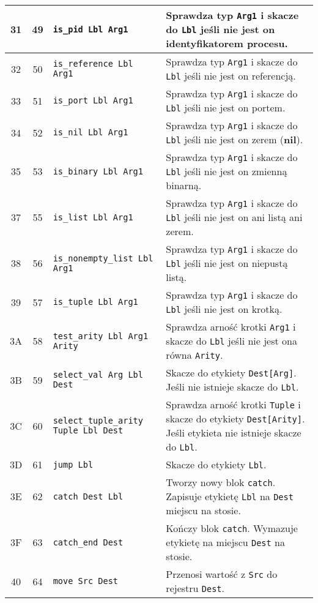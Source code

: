 \begin{longtable}{|c|c|p{5cm}|p{7cm}|}
\hline
31 & 49 & \texttt{is\_pid Lbl Arg1} & Sprawdza typ \texttt{Arg1} i skacze do \texttt{Lbl} jeśli nie jest on identyfikatorem procesu.\\
\hline
32 & 50 & \texttt{is\_reference Lbl Arg1} & Sprawdza typ \texttt{Arg1} i skacze do \texttt{Lbl} jeśli nie jest on referencją.\\
\hline
33 & 51 & \texttt{is\_port Lbl Arg1} & Sprawdza typ \texttt{Arg1} i skacze do \texttt{Lbl} jeśli nie jest on portem.\\
\hline
34 & 52 & \texttt{is\_nil Lbl Arg1} & Sprawdza typ \texttt{Arg1} i skacze do \texttt{Lbl} jeśli nie jest on zerem (\textbf{nil}).\\
\hline
35 & 53 & \texttt{is\_binary Lbl Arg1} & Sprawdza typ \texttt{Arg1} i skacze do \texttt{Lbl} jeśli nie jest on zmienną binarną.\\
\hline
37 & 55 & \texttt{is\_list Lbl Arg1} & Sprawdza typ \texttt{Arg1} i skacze do \texttt{Lbl} jeśli nie jest on ani listą ani zerem.\\
\hline
38 & 56 & \texttt{is\_nonempty\_list Lbl Arg1} & Sprawdza typ \texttt{Arg1} i skacze do \texttt{Lbl} jeśli nie jest on niepustą listą.\\
\hline
39 & 57 & \texttt{is\_tuple Lbl Arg1} & Sprawdza typ \texttt{Arg1} i skacze do \texttt{Lbl} jeśli nie jest on krotką.\\
\hline
3A & 58 & \texttt{test\_arity Lbl Arg1 Arity} & Sprawdza arność krotki \texttt{Arg1} i skacze do \texttt{Lbl} jeśli nie jest ona równa \texttt{Arity}.\\
\hline
3B & 59 & \texttt{select\_val Arg Lbl Dest} & Skacze do etykiety \texttt{Dest[Arg]}. Jeśli nie istnieje skacze do \texttt{Lbl}. \\
\hline
3C & 60 & \texttt{select\_tuple\_arity Tuple Lbl Dest} & Sprawdza arność krotki \texttt{Tuple} i skacze do etykiety \texttt{Dest[Arity]}. Jeśli etykieta nie istnieje skacze do \texttt{Lbl}. \\
\hline
3D & 61 & \texttt{jump Lbl} & Skacze do etykiety \texttt{Lbl}. \\
\hline
3E & 62 & \texttt{catch Dest Lbl} & Tworzy nowy blok \texttt{catch}. Zapisuje etykietę \texttt{Lbl} na \texttt{Dest} miejscu na stosie. \\
\hline
3F & 63 & \texttt{catch\_end Dest} & Kończy blok \texttt{catch}. Wymazuje etykietę na miejscu \texttt{Dest} na stosie. \\
\hline
40 & 64 & \texttt{move Src Dest} & Przenosi wartość z \texttt{Src} do rejestru \texttt{Dest}. \\

\end{longtable}
